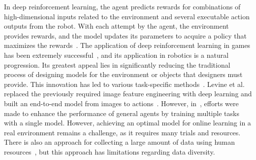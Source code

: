 In deep reinforcement learning, the agent predicts rewards for combinations of high-dimensional inputs related to the environment and several executable action outputs from the robot. With each attempt by the agent, the environment provides rewards, and the model updates its parameters to acquire a policy that maximizes the rewards~\cite{Levine2016jmlr,Levine2017ijrr,Haarnoja2017icml}. The application of deep reinforcement learning in games has been extremely successful~\cite{Mnih2013playing,Hessel2018rainbow}, and its application in robotics is a natural progression. Its greatest appeal lies in significantly reducing the traditional process of designing models for the environment or objects that designers must provide. This innovation has led to various task-specific methods~\cite{Tsurumine2019ras,Mahler2019learning}. Levine et al. replaced the previously required image feature engineering with deep learning and built an end-to-end model from images to actions~\cite{Levine2017ijrr}. However, in~\cite{lee2023pi,rlscale2023arxiv}, efforts were made to enhance the performance of general agents by training multiple tasks with a single model. However, achieving an optimal model for online learning in a real environment remains a challenge, as it requires many trials and resources. There is also an approach for collecting a large amount of data using human resources~\cite{dasari2019robonet,rt12022arxiv}, but this approach has limitations regarding data diversity.


